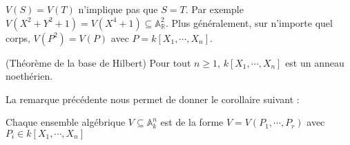             \begin{remq}
                $V(S) = V(T)$ n'implique pas que $S = T$. Par exemple $V(X^2 + Y^2 + 1) = V(X^4 + 1) \subseteq \mathbb{A}_\mathbb{R}^2$. Plus généralement, sur n'importe quel corps, $V(P^2) = V(P)$ avec $P = k[X_1, \cdots, X_n]$.
            \end{remq}
            \begin{theo} (Théorème de la base de Hilbert)
                Pour tout $n \geq 1$, $k[X_1, \cdots, X_n]$ est un anneau noethérien.
            \end{theo}
            La remarque précédente nous permet de donner le corollaire suivant :
            \begin{coro}
                Chaque ensemble algébrique $V \subseteq \mathbb{A}_k^n$ est de la forme $V = V(P_1, \cdots, P_r)$ avec $P_i \in k[X_1, \cdots, X_n]$
            \end{coro}

